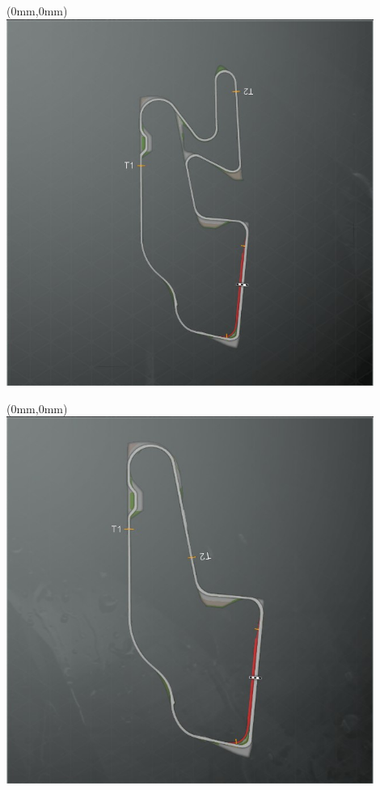 \null\newpage
\begin{textblock*}{30mm}(0mm,0mm)%
\includegraphics[width=120mm]{TR/2015-05-20_00066.png}
\end{textblock*}
\null\newpage
\begin{textblock*}{30mm}(0mm,0mm)%
\includegraphics[width=120mm]{TR/2015-05-20_00067.png}
\end{textblock*}
